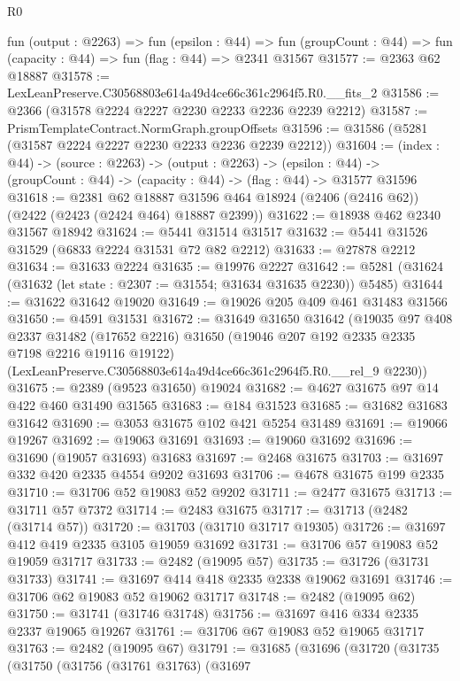 \begin{lexlean}{R0}
\begin{coremodule}
  fun (output : @2263) =>
  fun (epsilon : @44) =>
  fun (groupCount : @44) => fun (capacity : @44) => fun (flag : @44) => @2341 @31567
@31577 := @2363 @62 @18887
@31578 := LexLeanPreserve.C30568803e614a49d4ce66c361c2964f5.R0.__fits_2
@31586 := @2366 (@31578 @2224 @2227 @2230 @2233 @2236 @2239 @2212)
@31587 := PrismTemplateContract.NormGraph.groupOffsets
@31596 := @31586 (@5281 (@31587 @2224 @2227 @2230 @2233 @2236 @2239 @2212))
@31604 := (index : @44) ->
  (source : @2263) ->
  (output : @2263) ->
  (epsilon : @44) -> (groupCount : @44) -> (capacity : @44) -> (flag : @44) -> @31577 @31596
@31618 := @2381
    @62
    @18887
    @31596
    @464
    @18924
    (@2406 (@2416 @62))
    (@2422 (@2423 (@2424 @464) @18887 @2399))
@31622 := @18938 @462 @2340 @31567 @18942
@31624 := @5441 @31514 @31517
@31632 := @5441 @31526 @31529 (@6833 @2224 @31531 @72 @82 @2212)
@31633 := @27878 @2212
@31634 := @31633 @2224
@31635 := @19976 @2227
@31642 := @5281 (@31624 (@31632 (let state : @2307 := @31554; @31634 @31635 @2230)) @5485)
@31644 := @31622 @31642 @19020
@31649 := @19026 @205 @409 @461 @31483 @31566
@31650 := @4591 @31531
@31672 := @31649
    @31650
    @31642
    (@19035
      @97
      @408
      @2337
      @31482
      (@17652 @2216)
      @31650
      (@19046 @207 @192 @2335 @2335 @7198 @2216 @19116 @19122)
      (LexLeanPreserve.C30568803e614a49d4ce66c361c2964f5.R0.__rel_9 @2230))
@31675 := @2389 (@9523 @31650) @19024
@31682 := @4627 @31675 @97 @14 @422 @460 @31490 @31565
@31683 := @184 @31523
@31685 := @31682 @31683 @31642
@31690 := @3053 @31675 @102 @421 @5254 @31489
@31691 := @19066 @19267
@31692 := @19063 @31691
@31693 := @19060 @31692
@31696 := @31690 (@19057 @31693) @31683
@31697 := @2468 @31675
@31703 := @31697 @332 @420 @2335 @4554 @9202 @31693
@31706 := @4678 @31675 @199 @2335
@31710 := @31706 @52 @19083 @52 @9202
@31711 := @2477 @31675
@31713 := @31711 @57 @7372
@31714 := @2483 @31675
@31717 := @31713 (@2482 (@31714 @57))
@31720 := @31703 (@31710 @31717 @19305)
@31726 := @31697 @412 @419 @2335 @3105 @19059 @31692
@31731 := @31706 @57 @19083 @52 @19059 @31717
@31733 := @2482 (@19095 @57)
@31735 := @31726 (@31731 @31733)
@31741 := @31697 @414 @418 @2335 @2338 @19062 @31691
@31746 := @31706 @62 @19083 @52 @19062 @31717
@31748 := @2482 (@19095 @62)
@31750 := @31741 (@31746 @31748)
@31756 := @31697 @416 @334 @2335 @2337 @19065 @19267
@31761 := @31706 @67 @19083 @52 @19065 @31717
@31763 := @2482 (@19095 @67)
@31791 := @31685
    (@31696
      (@31720
        (@31735
          (@31750
            (@31756
              (@31761 @31763)
              (@31697

\end{coremodule}
\end{lexlean}
